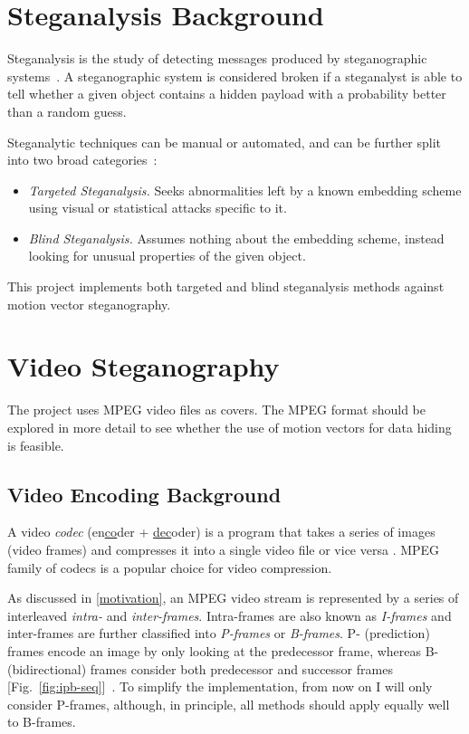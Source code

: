 \documentclass[12pt,british,twoside,notitlepage,usenames,dvipsnames,hypens,final]{report}
\numberwithin{equation}{section}
\numberwithin{figure}{section}
\begin{document}
\section{Steganalysis Background}

Steganalysis is the study of detecting messages produced by steganographic systems~\cite[p.~10]{fridrich}. A steganographic system is considered broken if a steganalyst is able to tell whether a given object contains a hidden payload with a probability better than a random guess.

Steganalytic techniques can be manual or automated, and can be further split into two broad categories~\cite{bateman}:
\begin{itemize}
\item \emph{Targeted Steganalysis.} Seeks abnormalities left by a known embedding scheme using visual or statistical attacks specific to it.
\item \emph{Blind Steganalysis.} Assumes nothing about the embedding scheme, instead looking for unusual properties of the given object. 
\end{itemize} 

This project implements both targeted and blind steganalysis methods against motion vector steganography.

\section{Video Steganography}

The project uses MPEG video files as covers. The MPEG format should be explored in more detail to see whether the use of motion vectors for data hiding is feasible.

\subsection{Video Encoding Background}

A video \emph{codec} (en\underline{co}der + \underline{dec}oder) is a program that takes a series of images (video frames) and compresses it into a single video file or vice versa \cite[sec.~3.1]{richardson2004h}. MPEG family of codecs is a popular choice for video compression.

As discussed in \ref{motivation}, an MPEG video stream is represented by a series of interleaved \emph{intra-} and \emph{inter-frames}. Intra-frames are also known as \emph{I-frames} and inter-frames are further classified into \emph{P-frames} or \emph{B-frames}. P- (prediction) frames encode an image by only looking at the predecessor frame, whereas B- (bidirectional) frames consider both predecessor and successor frames [Fig.~\ref{fig:ipb-seq}]~\cite{crowcroft1999internetworking}. To simplify the implementation, from now on I will only consider P-frames, although, in principle, all methods should apply equally well to B-frames.
\end{document}
